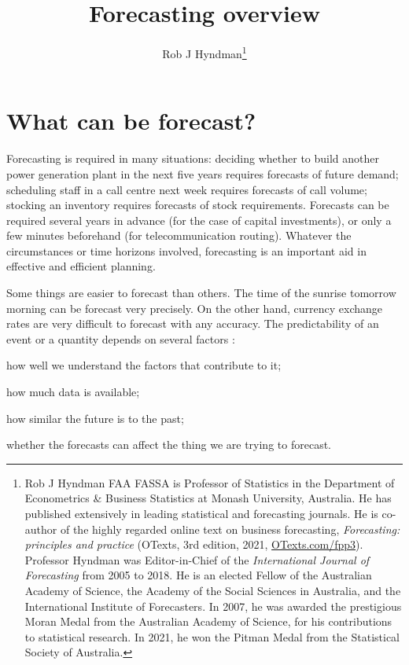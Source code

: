 \documentclass[a4paper,10pt]{article}
\begin{document}
\title{Forecasting overview}
\author{Rob J Hyndman\footnote{Rob J Hyndman FAA FASSA is Professor of Statistics in the Department of Econometrics \& Business Statistics at Monash University, Australia. He has published extensively in leading statistical and forecasting journals. He is co-author of the highly regarded online text on business forecasting, \emph{Forecasting: principles and practice} (OTexts, 3rd edition, 2021, \url{OTexts.com/fpp3}). Professor Hyndman was Editor-in-Chief of the \emph{International Journal of Forecasting} from 2005 to 2018. He is an elected Fellow of the Australian Academy of Science, the Academy of the Social Sciences in Australia, and the International Institute of Forecasters. In 2007, he was awarded the prestigious Moran Medal from the Australian Academy of Science, for his contributions to statistical research. In 2021, he won the Pitman Medal from the Statistical Society of Australia.}}
\date{}
\maketitle

\section{What can be forecast?}

Forecasting is required in many situations: deciding whether to build another power generation plant in the next five years requires forecasts of future demand; scheduling staff in a call centre next week requires forecasts of call volume; stocking an inventory requires forecasts of stock requirements. Forecasts can be required several years in advance (for the case of capital investments), or only a few minutes beforehand (for telecommunication routing). Whatever the circumstances or time horizons involved, forecasting is an important aid in effective and efficient planning.

Some things are easier to forecast than others. The time of the sunrise tomorrow morning can be forecast very precisely. On the other hand, currency exchange rates are very difficult to forecast with any accuracy. The predictability of an event or a quantity depends on several factors \citep{fpp3}:
\begin{compactenum}
  \item how well we understand the factors that contribute to it;
  \item how much data is available;
  \item how similar the future is to the past;
  \item whether the forecasts can affect the thing we are trying to forecast.
\end{compactenum}
\end{document}
